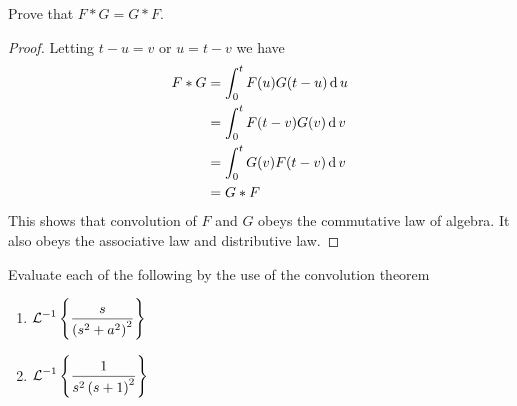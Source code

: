 \documentclass[../main-sheet.tex]{subfiles}
\begin{document}
\begin{prob}
    Prove that $ F*G=G*F $.
\end{prob}
\begin{proof}
    Letting $ t-u=v $ or $ u=t-v $ we have
    \begin{align*}
        F*G&=\int_0^t F(u)G(t-u)\,\mathrm{d}\, u\\
        &=\int_0^t F(t-v)G(v)\,\mathrm{d}\, v\\
        &=\int_0^t G(v)F(t-v)\,\mathrm{d}\, v\\
        &=G*F
    \end{align*}
    This shows that convolution of $ F $ and $ G $ obeys the commutative law of algebra. It also obeys the associative law and distributive law.
\end{proof}
\begin{prob}
    Evaluate each of the following by the use of the convolution theorem
    \begin{enumerate}[label=(\alph*)]
        \item $ \displaystyle \mathcal{L}^{-1}\left\{ \frac{s}{\left( s^2+a^2 \right)^2}\right\} $
        \item $ \displaystyle \mathcal{L}^{-1}\left\{ \frac{1}{s^2\left( s+1 \right)^2}\right\} $
    \end{enumerate}
\end{prob}
\end{document}
